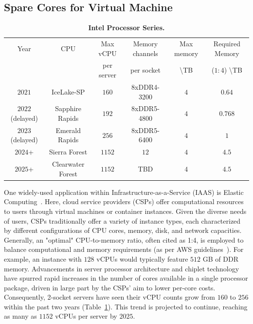 \subsection{Spare Cores for Virtual Machine}

\begin{table}[!]
  \centering
  \small
  \begin{tabular}{c|c|c|c|c|c} 
        \hline
        Year & CPU & Max vCPU  & Memory channels & Max memory & Required Memory \\
        & & per server & per socket & \textbackslash TB & ($1:4$) \textbackslash TB\\\hline
        $2021$ & IceLake-SP\cite{icelakecores} & $160$ & 8xDDR4-3200 & $4$ & $0.64$ \\\hline
        $2022$ (delayed) & Sapphire Rapids\cite{sprcores} & $192$ & 8xDDR5-4800 & 	$4$ & $0.768$ \\\hline
        $2023$ (delayed) & Emerald Rapids\cite{emeraldrapidscores} & $256$ & 8xDDR5-6400 & $4$ & $1$ \\\hline
        $2024$+  & Sierra Forest\cite{sierraforestcores} & $1152$ & $12$ & $4$ & $4.5$ \\\hline
        $2025$+ & Clearwater Forest\cite{clearwatercores} & $1152$ & TBD & $4$ & $4.5$ \\\hline
  \end{tabular}
  \caption[Intel Processor Series]{\textbf{Intel Processor Series.} }
  \label{tab:amd}
  \vspace{-1.5em}
\end{table}

One widely-used application within Infrastructure-as-a-Service (IAAS) is Elastic Computing~\cite{elasticcomputing}. Here, cloud service providers (CSPs) offer computational resources to users through virtual machines or container instances. Given the diverse needs of users, CSPs traditionally offer a variety of instance types, each characterized by different configurations of CPU cores, memory, disk, and network capacities. Generally, an "optimal" CPU-to-memory ratio, often cited as 1:4, is employed to balance computational and memory requirements (as per AWS guidelines~\cite{awsm7a, awsm7i}). For example, an instance with $128$ vCPUs would typically feature $512$ GB of DDR memory.
Advancements in server processor architecture and chiplet technology have spurred rapid increases in the number of cores available in a single processor package, driven in large part by the CSPs' aim to lower per-core costs. Consequently, 2-socket servers have seen their vCPU counts grow from $160$ to $256$ within the past two years (Table~\ref{tab:amd}). This trend is projected to continue, reaching as many as $1152$ vCPUs per server by $2025$.



